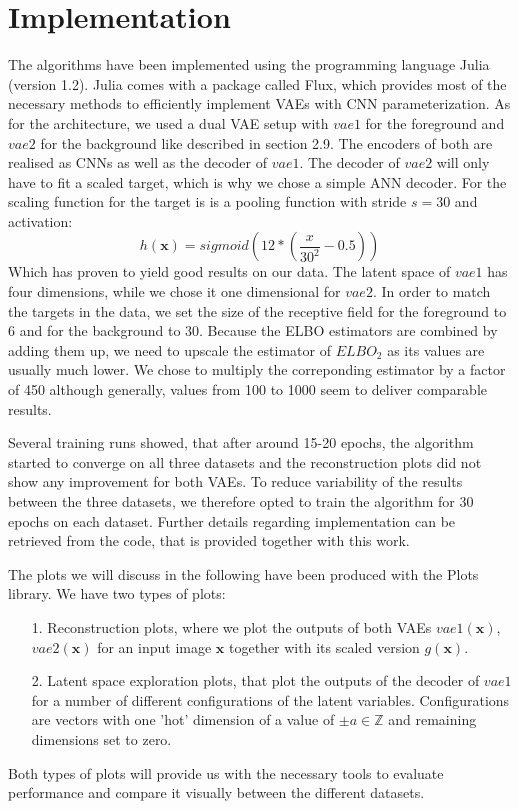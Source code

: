 \documentclass[12pt]{report}
\theoremstyle{definition}
\begin{document}
\section{Implementation}
The algorithms have been implemented using the programming language Julia (version 1.2). Julia comes with a package called Flux, which provides most of the necessary methods to efficiently implement VAEs with CNN parameterization.
As for the architecture, we used a dual VAE setup with $vae1$ for the foreground and $vae2$ for the background like described in section 2.9. The encoders of both are realised as CNNs as well as the decoder of $vae1$. The decoder of $vae2$ will only have to fit a scaled target, which is why we chose a simple ANN decoder. For the scaling function for the target is is a pooling function with stride $s=30$ and activation:
\begin{equation}
h(\mathbf{x}) = sigmoid(12*(\frac{x}{30^2}-0.5))
\end{equation}
Which has proven to yield good results on our data. The latent space of $vae1$ has four dimensions, while we chose it one dimensional for $vae2$. In order to match the targets in the data, we set the size of the receptive field for the foreground to 6 and for the background to 30. Because the ELBO estimators are combined by adding them up, we need to upscale the estimator of $ELBO_2$ as its values are usually much lower. We chose to multiply the correponding estimator by a factor of 450 although generally, values from 100 to 1000 seem to deliver comparable results.

Several training runs showed, that after around 15-20 epochs, the algorithm started to converge on all three datasets and the reconstruction plots did not show any improvement for both VAEs. To reduce variability of the results between the three datasets, we therefore opted to train the algorithm for 30 epochs on each dataset.
Further details regarding implementation can be retrieved from the code, that is provided together with this work.

The plots we will discuss in the following have been produced with the Plots library. We have two types of plots:
\begin{itemize}
\item[1.] Reconstruction plots, where we plot the outputs of both VAEs $vae1(\mathbf{x})$, $vae2(\mathbf{x})$ for an input image $\mathbf{x}$ together with its scaled version $g(\mathbf{x})$.
\item[2.] Latent space exploration plots, that plot the outputs of the decoder of $vae1$ for a number of different configurations of the latent variables. Configurations are vectors with one 'hot' dimension of a value of $\pm a \in \mathbb{Z}$ and remaining dimensions set to zero.
\end{itemize}
Both types of plots will provide us with the necessary tools to evaluate performance and compare it visually between the different datasets.
\end{document}
